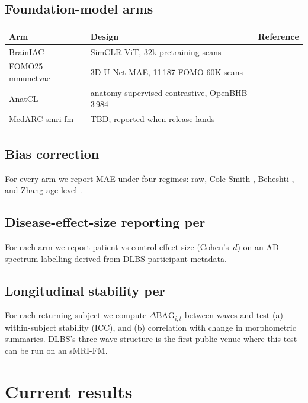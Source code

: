 \documentclass[11pt]{article}
\begin{document}
\subsection{Foundation-model arms}



\begin{center}
\begin{tabular}{lll}
\toprule
Arm & Design & Reference \\
\midrule
BrainIAC & SimCLR ViT, 32k pretraining scans & \citep{brainiac2026} \\
FOMO25 mmunetvae & 3D U-Net MAE, 11\,187 FOMO-60K scans & \citep{gordaliza2026} \\
AnatCL & anatomy-supervised contrastive, OpenBHB 3\,984 & \citep{barbano2024anatcl} \\
MedARC smri-fm & TBD; reported when release lands & \citep{medarcsmrifm2026} \\
\bottomrule
\end{tabular}
\end{center}


\subsection{Bias correction}

For every arm we report MAE under four regimes: raw, Cole-Smith
\citep{smith2019}, Beheshti \citep{liang2019}, and Zhang age-level
\citep{zhang2023agelevel}.

\subsection{Disease-effect-size reporting per \citet{schulz2025}}

For each arm we report patient-vs-control effect size (Cohen's~$d$)
on an AD-spectrum labelling derived from DLBS participant metadata.

\subsection{Longitudinal stability per \citet{vidalpineiro2021}}

For each returning subject we compute $\Delta\mathrm{BAG}_{i,t}$
between waves and test (a) within-subject stability (ICC), and
(b) correlation with change in morphometric summaries. DLBS's three-wave
structure is the first public venue where this test can be run on an
sMRI-FM.

\section{Current results}
\end{document}
